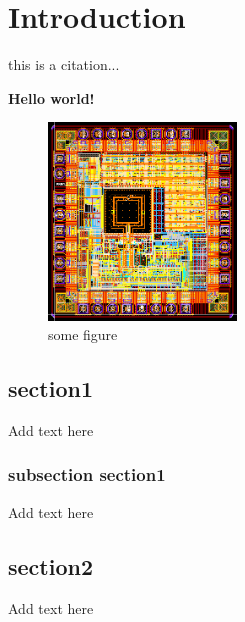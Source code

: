 \documentclass[../main.tex]{subfiles}
\begin{document}
\chapter{Introduction}
this is a citation...\cite{salemi2013uvm}

\textbf{Hello world!}

\begin{figure}[bh]
\centering
\includegraphics[width=5cm]{diagrams/MPW2Naretlayout.png}

\label{fig:img1}
\caption{some figure}
\end{figure}

\section{section1}
Add text here

\subsection{subsection section1}
Add text here

\section{section2}
Add text here
\end{document}
